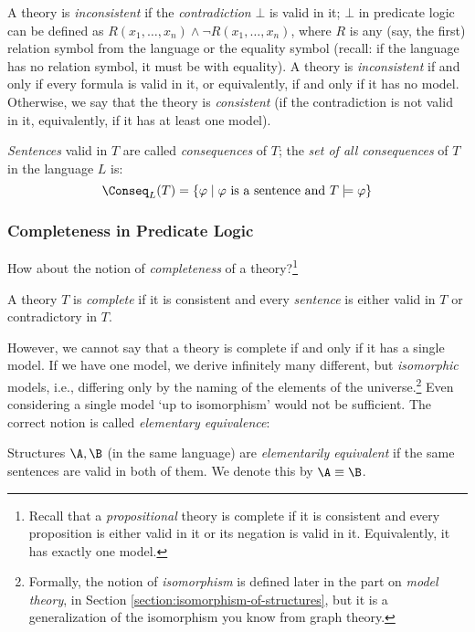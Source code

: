 A theory is \emph{inconsistent} if the \emph{contradiction} $\bot$ is valid in it; $\bot$ in predicate logic can be defined as $R(x_1,\dots,x_n)\land \neg R(x_1,\dots,x_n)$, where $R$ is any (say, the first) relation symbol from the language or the equality symbol (recall: if the language has no relation symbol, it must be with equality). A theory is \emph{inconsistent} if and only if every formula is valid in it, or equivalently, if and only if it has no model. Otherwise, we say that the theory is \emph{consistent} (if the contradiction is not valid in it, equivalently, if it has at least one model).

\emph{Sentences} valid in $T$ are called \emph{consequences} of $T$; the \emph{set of all consequences} of $T$ in the language $L$ is:
$$
\Conseq_L(T)=\{\varphi\mid\text{$\varphi$ is a sentence and }T\models \varphi\}
$$

\subsubsection{Completeness in Predicate Logic}

How about the notion of \emph{completeness} of a theory?\footnote{Recall that a \emph{propositional} theory is complete if it is consistent and every proposition is either valid in it or its negation is valid in it. Equivalently, it has exactly one model.}

\begin{definition}
    A theory $T$ is \emph{complete} if it is consistent and every \emph{sentence} is either valid in $T$ or contradictory in $T$.
\end{definition}

However, we cannot say that a theory is complete if and only if it has a single model. If we have one model, we derive infinitely many different, but \emph{isomorphic} models, i.e., differing only by the naming of the elements of the universe.\footnote{Formally, the notion of \emph{isomorphism} is defined later in the part on \emph{model theory}, in Section \ref{section:isomorphism-of-structures}, but it is a generalization of the isomorphism you know from graph theory.} Even considering a single model `up to isomorphism' would not be sufficient. The correct notion is called \emph{elementary equivalence}:

\begin{definition}
    Structures $\A,\B$ (in the same language) are \emph{elementarily equivalent} if the same sentences are valid in both of them. We denote this by $\A\equiv\B$.
\end{definition}

